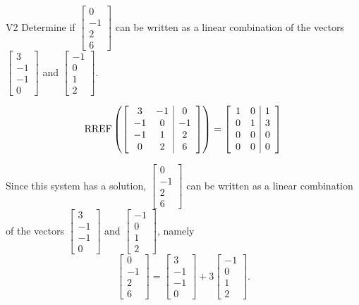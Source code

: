 \begin{problem}{V2}
Determine if \(\begin{bmatrix}0 \\ -1 \\ 2 \\ 6 \end{bmatrix}\) can be written as a linear combination of the vectors \(\begin{bmatrix} 3 \\ -1 \\ -1 \\ 0 \end{bmatrix}\) and \(\begin{bmatrix} -1 \\ 0 \\ 1 \\ 2 \end{bmatrix}\).
\end{problem}
\begin{solution}
\[\operatorname{RREF}\left(\left[\begin{array}{cc|c} 3 & -1 & 0 \\ -1 & 0 & -1 \\ -1 & 1 & 2 \\ 0 & 2 & 6\end{array} \right] \right)= \left[ \begin{array}{cc|c} 1 & 0 & 1 \\ 0 & 1 & 3 \\ 0 & 0 & 0 \\ 0 & 0 & 0 \end{array} \right]\]

Since this system has a solution, \(\begin{bmatrix}0 \\ -1 \\ 2 \\ 6 \end{bmatrix}\) can be written as a linear combination of the vectors \(\begin{bmatrix} 3 \\ -1 \\ -1 \\ 0 \end{bmatrix}\) and \(\begin{bmatrix} -1 \\ 0 \\ 1 \\ 2 \end{bmatrix}\), namely
\[\begin{bmatrix}0 \\ -1 \\ 2 \\ 6 \end{bmatrix}=\begin{bmatrix} 3 \\ -1 \\ -1 \\ 0 \end{bmatrix}+3\begin{bmatrix} -1 \\ 0 \\ 1 \\ 2 \end{bmatrix}.\]
\end{solution}

